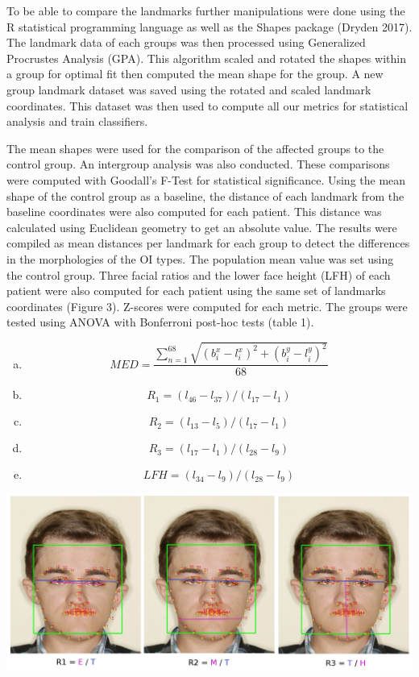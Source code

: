 \documentclass{article}
\begin{document}
\begin{multicols}{2}
To be able to compare the landmarks further manipulations were done
using the R statistical programming language as well as the Shapes
package (Dryden 2017). The landmark data of each groups was then
processed using Generalized Procrustes Analysis (GPA). This algorithm
scaled and rotated the shapes within a group for optimal fit then
computed the mean shape for the group. A new group landmark dataset was
saved using the rotated and scaled landmark coordinates. This dataset
was then used to compute all our metrics for statistical analysis and
train classifiers.


The mean shapes were used for the comparison of the affected groups to
the control group. An intergroup analysis was also conducted. These
comparisons were computed with Goodall's F-Test for statistical
significance. Using the mean shape of the control group as a baseline,
the distance of each landmark from the baseline coordinates were also
computed for each patient. This distance was calculated using Euclidean
geometry to get an absolute value. The results were compiled as mean
distances per landmark for each group to detect the differences in the
morphologies of the OI types. The population mean value was set using
the control group. Three facial ratios and the lower face height (LFH)
of each patient were also computed for each patient using the same set
of landmarks coordinates (Figure 3). Z-scores were computed for each
metric. The groups were tested using ANOVA with Bonferroni post-hoc
tests (table 1).

\begin{center}
  \begin{enumerate}[(a)]
\item \[MED=\dfrac{\sum_{n=1}^{68} \sqrt{(b_i^x-l_i^x)^2+(b_i^y-l_i^y)^2}}{68}\]
\item \[R_1=(l_{46}-l_{37})/(l_{17}-l_1)\]
\item \[R_2=(l_{13}-l_5)/(l_{17}-l_1)\]
\item \[R_3=(l_{17}-l_1)/(l_{28}-l_9)\]
\item \[LFH=(l_{34}-l_{9})/(l_{28}-l_{9})\]
\end{enumerate}
\end{center}

\begin{center}
\includegraphics[width=\linewidth]{figures/ratios.png}
\end{center}


\end{multicols}
\end{document}
